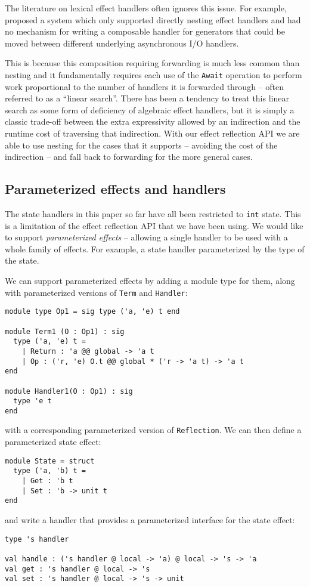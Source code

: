 \documentclass[acmsmall, screen, nonacm]{acmart}
\theoremstyle{definition}
\begin{document}
The literature on lexical effect handlers often ignores this issue. For
example, \cite{??} proposed a system which only supported directly
nesting effect handlers and had no mechanism for writing a composable
handler for generators that could be moved between different underlying
asynchronous I/O handlers.

This is because this composition requiring forwarding is much less
common than nesting and it fundamentally requires each use of the
\lstinline[style=oxcaml]{Await} operation to perform work proportional to
the number of handlers it is forwarded through -- often referred to as a
``linear search''. There has been a tendency to treat this linear search
as some form of deficiency of algebraic effect handlers, but it is
simply a classic trade-off between the extra expressivity allowed by an
indirection and the runtime cost of traversing that indirection. With
our effect reflection API we are able to use nesting for the cases that
it supports -- avoiding the cost of the indirection -- and fall back to
forwarding for the more general cases.

\subsection{Parameterized effects and handlers}

The state handlers in this paper so far have all been restricted to
\lstinline[style=oxcaml]{int} state. This is a limitation of the effect
reflection API that we have been using. We would like to support
\emph{parameterized effects} -- allowing a single handler to be used
with a whole family of effects. For example, a state handler
parameterized by the type of the state.

We can support parameterized effects by adding a module type for them,
along with parameterized versions of \lstinline[style=oxcaml]{Term} and
\lstinline[style=oxcaml]{Handler}:
\begin{lstlisting}[style=oxcaml]
module type Op1 = sig type ('a, 'e) t end

module Term1 (O : Op1) : sig
  type ('a, 'e) t =
    | Return : 'a @@ global -> 'a t
    | Op : ('r, 'e) O.t @@ global * ('r -> 'a t) -> 'a t
end

module Handler1(O : Op1) : sig
  type 'e t
end
\end{lstlisting}
with a corresponding parameterized version of
\lstinline[style=oxcaml]{Reflection}. We can then define a parameterized
state effect:
\begin{lstlisting}[style=oxcaml]
module State = struct
  type ('a, 'b) t =
    | Get : 'b t
    | Set : 'b -> unit t
end
\end{lstlisting}
and write a handler that provides a parameterized interface for the
state effect:
\begin{lstlisting}[style=oxcaml]
type 's handler

val handle : ('s handler @ local -> 'a) @ local -> 's -> 'a
val get : 's handler @ local -> 's
val set : 's handler @ local -> 's -> unit
\end{lstlisting}
\end{document}
